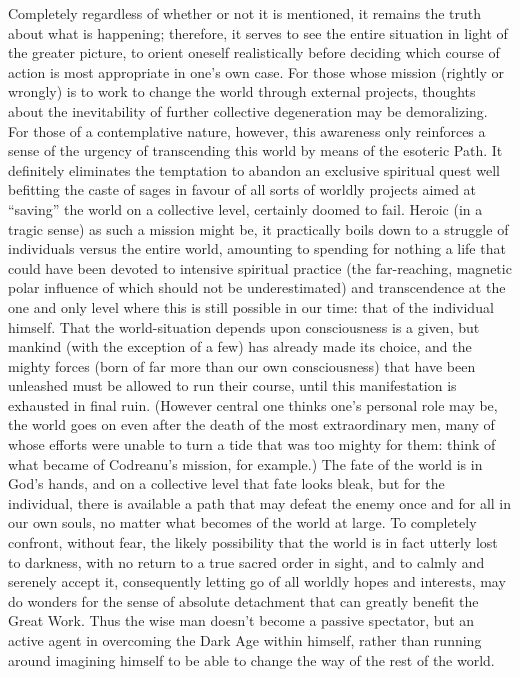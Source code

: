 \begin{footnotesize}
\begin{sffamily}
Completely regardless of whether or not it is mentioned, it remains the truth about what is happening; therefore, it serves to see the entire situation in light of the greater picture, to orient oneself realistically before deciding which course of action is most appropriate in one's own case. For those whose mission (rightly or wrongly) is to work to change the world through external projects, thoughts about the inevitability of further collective degeneration may be demoralizing. For those of a contemplative nature, however, this awareness only reinforces a sense of the urgency of transcending this world by means of the esoteric Path. It definitely eliminates the temptation to abandon an exclusive spiritual quest well befitting the caste of sages in favour of all sorts of worldly projects aimed at ``saving'' the world on a collective level, certainly doomed to fail. Heroic (in a tragic sense) as such a mission might be, it practically boils down to a struggle of individuals versus the entire world, amounting to spending for nothing a life that could have been devoted to intensive spiritual practice (the far-reaching, magnetic polar influence of which should not be underestimated) and transcendence at the one and only level where this is still possible in our time: that of the individual himself. That the world-situation depends upon consciousness is a given, but mankind (with the exception of a few) has already made its choice, and the mighty forces (born of far more than our own consciousness) that have been unleashed must be allowed to run their course, until this manifestation is exhausted in final ruin. (However central one thinks one's personal role may be, the world goes on even after the death of the most extraordinary men, many of whose efforts were unable to turn a tide that was too mighty for them: think of what became of Codreanu's mission, for example.) The fate of the world is in God's hands, and on a collective level that fate looks bleak, but for the individual, there is available a path that may defeat the enemy once and for all in our own souls, no matter what becomes of the world at large. To completely confront, without fear, the likely possibility that the world is in fact utterly lost to darkness, with no return to a true sacred order in sight, and to calmly and serenely accept it, consequently letting go of all worldly hopes and interests, may do wonders for the sense of absolute detachment that can greatly benefit the Great Work. Thus the wise man doesn't become a passive spectator, but an active agent in overcoming the Dark Age within himself, rather than running around imagining himself to be able to change the way of the rest of the world.


\end{sffamily}
\end{footnotesize}
